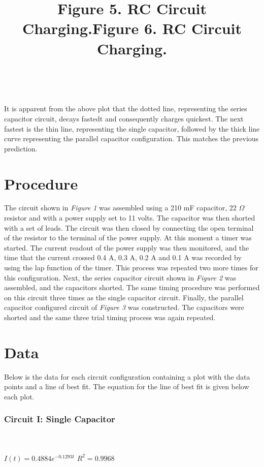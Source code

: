 \documentclass[12pt,letterpaper]{article}
\begin{document}
\begin{center}
		\title{\textbf{Figure 5}. RC Circuit Charging.}\\
    	\resizebox{0.6\textwidth}{!}{}
\end{center}
It is apparent from the above plot that the dotted line, representing the series capacitor circuit, decays fastedt and consequently charges quickest. The next fastest is the thin line, representing the single capacitor, followed by the thick line curve representing the parallel capacitor configuration. This matches the previous prediction.
\section*{Procedure}
The circuit shown in \textit{Figure 1} was assembled using a 210 mF capacitor, 22 $\Omega$ resistor and with a power supply set to 11 volts. The capacitor was then shorted with a set of leads. The circuit was then closed by connecting the open terminal of the resistor to the terminal of the power supply. At this moment a timer was started. The current readout of the power supply was then monitored, and the time that the current crossed 0.4 A, 0.3 A, 0.2 A and 0.1 A was recorded by using the lap function of the timer. This process was repeated two more times for this configuration. Next, the series capacitor circuit shown in \textit{Figure 2} was assembled, and the capacitors shorted. The same timing procedure was performed on this circuit three times as the single capacitor circuit. Finally, the parallel capacitor configured circuit of \textit{Figure 3} was constructed. The capacitors were shorted and the same three trial timing process was again repeated.
\pagebreak
\section*{Data}
Below is the data for each circuit configuration containing a plot with the data points and a line of best fit. The equation for the line of best fit is given below each plot.\vspace{-12pt}
\subsubsection*{Circuit I: Single Capacitor}
\begin{center}
		\title{\textbf{Figure 6}. RC Circuit Charging.}\\
    	\resizebox{0.5\textwidth}{!}{}\\
    	\small$I(t)= 0.4884e^{-0.1293t}$ \hspace{24pt}$R^2 = 0.9968$
\end{center}
\vspace{-12pt}
\end{document}
